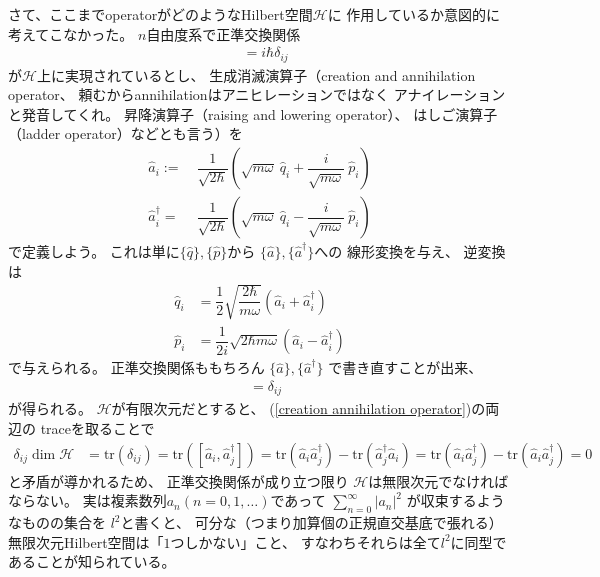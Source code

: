 さて、ここまでoperatorがどのようなHilbert空間$\mathcal{H}$に
作用しているか意図的に考えてこなかった。
$n$自由度系で正準交換関係
\begin{align}
    [ \hat{q}_i , \hat{p}_j ] &= i\hbar \delta_{ij}
\end{align}
が$\mathcal{H}$上に実現されているとし、
生成消滅演算子（creation and annihilation operator、
頼むからannihilationはアニヒレーションではなく
アナイレーションと発音してくれ。
昇降演算子（raising and lowering operator）、
はしご演算子（ladder operator）などとも言う）を
\begin{align}
    \hat{a}_i :=\ &
    \dfrac{1}{\sqrt{2\hbar}}
    \left(
        \sqrt{
            m\omega
        }\ \hat{q}_i
        +
        \dfrac{i}{\sqrt{m\omega}}
        \ \hat{p}_i
    \right)
\\
    \hat{a}^\dagger_i =\ &
    \dfrac{1}{\sqrt{2\hbar}}
    \left(
        \sqrt{
            m\omega
        }\ \hat{q}_i
        -
        \dfrac{i}{\sqrt{m\omega}}
        \ \hat{p}_i
    \right)
\end{align}
で定義しよう。
これは単に$\{\hat{q}\}, \{\hat{p}\}$から
$\{\hat{a}\}, \{\hat{a}^\dagger\}$への
線形変換を与え、
逆変換は
\begin{subequations}
\begin{align}
    \hat{q}_i &=
    \dfrac{1}{2}\sqrt{
        \dfrac{2\hbar}{m\omega}
    }
    \left(
        \hat{a}_i + \hat{a}^\dagger_i
    \right)
\\
    \hat{p}_i &=
    \dfrac{1}{2i}\sqrt{
        2\hbar m\omega
    }
    \left(
        \hat{a}_i - \hat{a}^\dagger_i
    \right)
\end{align}
\end{subequations}
で与えられる。
正準交換関係ももちろん
$\{\hat{a}\}, \{\hat{a}^\dagger\}$
で書き直すことが出来、
\begin{align}
    [\hat{a}_i, \hat{a}^\dagger_j]
    &=\delta_{ij}
\label{creation annihilation operator}
\end{align}
が得られる。
$ \mathcal{H} $が有限次元だとすると、
(\ref{creation annihilation operator})の両辺の
traceを取ることで
\begin{align}
    \delta_{ij}
    \dim \mathcal{H}
    &=
    \mathrm{tr} (\delta_{ij})
    =
    \mathrm{tr} \left(
        [\hat{a}_i, \hat{a}^\dagger_j]
    \right)
    =
    \mathrm{tr} \left(
        \hat{a}_i \hat{a}^\dagger_j
    \right)
    -
    \mathrm{tr} \left(
        \hat{a}^\dagger_j \hat{a}_i
    \right)
    =
    \mathrm{tr} \left(
        \hat{a}_i \hat{a}^\dagger_j
    \right)
    -
    \mathrm{tr} \left(
        \hat{a}_i \hat{a}^\dagger_j
    \right)
    = 0
\end{align}
と矛盾が導かれるため、
正準交換関係が成り立つ限り
$\mathcal{H}$は無限次元でなければならない。
実は複素数列$a_n (n=0,1,\dots)$であって
$\sum_{n=0}^\infty |a_n|^2$
が収束するようなものの集合を
$l^2$と書くと、
可分な（つまり加算個の正規直交基底で張れる）
無限次元Hilbert空間は「$1$つしかない」こと、
すなわちそれらは全て$l^2$に同型であることが知られている。

